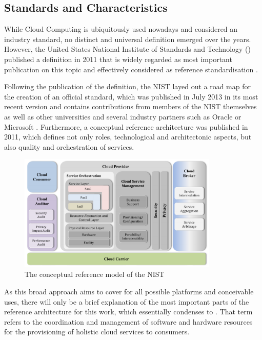 \subsection{Standards and Characteristics}
\label{subsec:cloud-standards}
While Cloud Computing is ubiquitously used nowadays and considered an industry standard, no distinct and universal definition emerged over the years. However, the United States National Institute of Standards and Technology () published a definition in 2011 that is widely regarded as most important publication on this topic and effectively considered as reference standardisation \cite{mell2011nist}. 

Following the publication of the definition, the NIST layed out a road map for the creation of an official standard, which was published in July 2013 in its most recent version and contains contributions from members of the NIST themselves as well as other universities and several industry partners such as Oracle or Microsoft \cite{sokol2013nist}. Furthermore, a conceptual reference architecture was published in 2011, which defines not only roles, technological and architectonic aspects, but also quality and orchestration of services. 

\begin{figure}[H]
	\centering
		\includegraphics[width=0.85\textwidth]{images/cc_conceptual_reference_model.png}
	\caption{The conceptual reference model of the NIST \cite{liu2012reference}}
\end{figure}

As this broad approach aims to cover for all possible platforms and conceivable uses, there will only be a brief explanation of the most important parts of the reference architecture for this work, which essentially condenses to . That term refers to the coordination and management of software and hardware resources for the provisioning of holistic cloud services to consumers.

